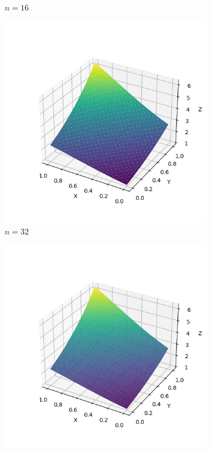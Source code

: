 \documentclass[lang=cn,a4paper,newtx,bibend=bibtex]{elegantpaper}
\begin{document}
\begin{figure}[H]
\begin{subfigure}[b]{0.18\textwidth}
      \caption{$n= 16$}
  \end{subfigure}
  \hfill
  \begin{subfigure}[b]{0.18\textwidth}
      \includegraphics[width=\textwidth]{../../res_bac/res-[data|1-mixed-regular-c32].png}
      \caption{$n = 32$}
  \end{subfigure}
  \hfill
  \begin{subfigure}[b]{0.18\textwidth}
      \includegraphics[width=\textwidth]{../../res_bac/res-[data|1-mixed-regular-d64].png}

\end{subfigure}
\end{figure}
\end{document}
